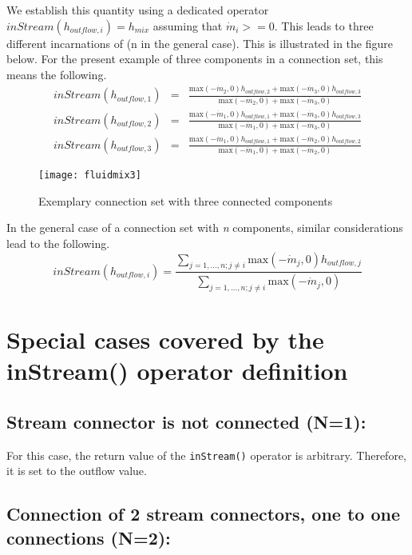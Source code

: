 We establish this quantity using a dedicated operator $inStream(h_{outflow,i})=h_{mix}$ assuming that $\dot{m}_{i} >= 0$. This leads to
three different incarnations of (n in the general case). This is
illustrated in the figure below. For the present example of three
components in a connection set, this means the following.
\begin{eqnarray*}
inStream(h_{outflow,1})&=&\frac{\text{max}(-\dot{m}_2,0)h_{outflow,2}+\text{max}(-\dot{m}_3,0)h_{outflow,3}}{\text{max}(-\dot{m}_2,0)+\text{max}(-\dot{m}_3,0)}\\
inStream(h_{outflow,2})&=&\frac{\text{max}(-\dot{m}_1,0)h_{outflow,1}+\text{max}(-\dot{m}_3,0)h_{outflow,3}}{\text{max}(-\dot{m}_1,0)+\text{max}(-\dot{m}_3,0)}\\
inStream(h_{outflow,3})&=&\frac{\text{max}(-\dot{m}_1,0)h_{outflow,1}+\text{max}(-\dot{m}_2,0)h_{outflow,2}}{\text{max}(-\dot{m}_1,0)+\text{max}(-\dot{m}_2,0)}
\end{eqnarray*}
\begin{figure}[H]
\caption{Exemplary connection set with three connected components}
\begin{center}
\texttt{[image: fluidmix3]}
\end{center}
\end{figure}

In the general case of a connection set with \emph{n} components,
similar considerations lead to the following.
\begin{equation*}
inStream(h_{outflow,i})=\frac{\sum_{j=1,...,n;j\neq i}\text{max}(-\dot{m}_j,0)h_{outflow,j}}{\sum_{j=1,...,n;j\neq i}\text{max}(-\dot{m}_j,0)}
\end{equation*}

\section{Special cases covered by the inStream() operator definition}
\subsection{Stream connector is not connected (N=1):}
For this case, the return value of the \lstinline!inStream()! operator is arbitrary.
Therefore, it is set to the outflow value.

\subsection{Connection of 2 stream connectors, one to one connections (N=2):}

